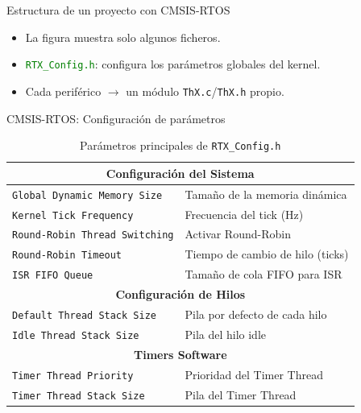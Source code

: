 \begin{frame}{Estructura de un proyecto con CMSIS-RTOS}
    \begin{itemize}
        \item La figura muestra solo algunos ficheros.
        \item \textcolor{green}{\texttt{RTX\_Config.h}}: configura los
              parámetros globales del kernel.
        \item Cada periférico $\rightarrow$ un módulo
              \texttt{ThX.c}/\texttt{ThX.h} propio.
    \end{itemize}
\end{frame}

\begin{frame}{CMSIS-RTOS: Configuración de parámetros}
    \begin{table}[H]
    \centering
    \begin{tabular}{|l|l|}
    \hline
    \multicolumn{2}{|c|}{\textbf{Configuración del Sistema}} \\
    \hline
    \texttt{Global Dynamic Memory Size}    & Tamaño de la memoria dinámica \\
    \texttt{Kernel Tick Frequency}         & Frecuencia del tick (Hz) \\
    \texttt{Round-Robin Thread Switching}  & Activar Round-Robin \\
    \texttt{Round-Robin Timeout}           & Tiempo de cambio de hilo (ticks) \\
    \texttt{ISR FIFO Queue}                & Tamaño de cola FIFO para ISR \\
    \hline
    \multicolumn{2}{|c|}{\textbf{Configuración de Hilos}} \\
    \hline
    \texttt{Default Thread Stack Size}     & Pila por defecto de cada hilo \\
    \texttt{Idle Thread Stack Size}        & Pila del hilo idle \\
    \hline
    \multicolumn{2}{|c|}{\textbf{Timers Software}} \\
    \hline
    \texttt{Timer Thread Priority}         & Prioridad del Timer Thread \\
    \texttt{Timer Thread Stack Size}       & Pila del Timer Thread \\
    \hline
    \end{tabular}
    \caption{Parámetros principales de \texttt{RTX\_Config.h}}
    \end{table}
\end{frame}

